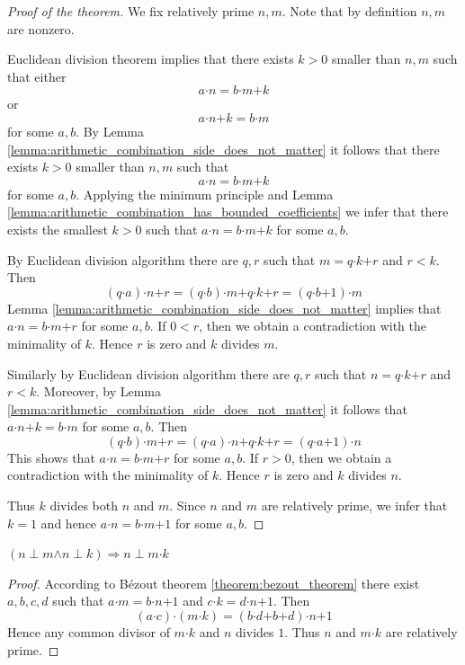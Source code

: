 \documentclass[10pt]{amsart}
\newcommand{\mra}{\boldsymbol{\Rightarrow}}
\newcommand{\mand}{\boldsymbol{\wedge}}
\newcommand{\mle}{\boldsymbol{<}}
\newcommand{\mge}{\boldsymbol{>}}
\newcommand{\meq}{\boldsymbol{=}}
\newcommand{\mplus}{\boldsymbol{+}}
\newcommand{\mdot}{\boldsymbol{\cdot}}
\newcommand{\theoremlabels}[2]{#1][#2}
\begin{document}
\begin{proof}[Proof of the theorem]
	We fix relatively prime $n,m$. Note that by definition $n,m$ are nonzero.

	Euclidean division theorem implies that there exists $k \mge 0$ smaller than $n,m$ such that either
	$$a\mdot n \meq b\mdot m \mplus k$$
	or
	$$a\mdot n \mplus k \meq b\mdot m$$
	for some $a,b$. By Lemma \ref{lemma:arithmetic_combination_side_does_not_matter} it follows that there exists $k \mge 0$ smaller than $n,m$ such that
	$$a\mdot n \meq b\mdot m \mplus k$$
	for some $a,b$. Applying the minimum principle and Lemma \ref{lemma:arithmetic_combination_has_bounded_coefficients} we infer that there exists the smallest $k \mge 0$ such that $a\mdot n \meq b\mdot m \mplus k$ for some $a,b$.

	By Euclidean division algorithm there are $q,r$ such that $m \meq q\mdot k \mplus r$ and $r \mle k$. Then
	$$(q\mdot a)\mdot n \mplus r \meq (q\mdot b)\mdot m \mplus q\mdot k \mplus r \meq (q\mdot b \mplus 1)\mdot m$$
	Lemma \ref{lemma:arithmetic_combination_side_does_not_matter} implies that $a\mdot n \meq b\mdot m \mplus r$ for some $a,b$. If $0 \mle r$, then we obtain a contradiction with the minimality of $k$. Hence $r$ is zero and $k$ divides $m$.

	Similarly by Euclidean division algorithm there are $q,r$ such that $n \meq q \mdot k \mplus r$ and $r \mle k$. Moreover, by Lemma \ref{lemma:arithmetic_combination_side_does_not_matter} it follows that $a\mdot n \mplus k \meq b\mdot m$ for some $a,b$. Then
	$$(q\mdot b) \mdot m \mplus r \meq (q\mdot a) \mdot n \mplus q\mdot k \mplus r \meq (q\mdot a \mplus 1)\mdot n$$
	This shows that $a\mdot n \meq b\mdot m \mplus r$ for some $a,b$. If $r \mge 0$, then we obtain a contradiction with the minimality of $k$. Hence $r$ is zero and $k$ divides $n$.

	Thus $k$ divides both $n$ and $m$. Since $n$ and $m$ are relatively prime, we infer that $k \meq 1$ and hence $a\mdot n \meq b\mdot m \mplus 1$ for some $a,b$.
\end{proof}

\begin{corollary}[\theoremlabels{$\mathrm{PRA}$}{Euclid's lemma}]\label{corollary:euclids_lemma}
	$\left(n \perp m \mand n \perp k\right) \mra n \perp m \mdot k$
\end{corollary}
\begin{proof}
	According to B{\'e}zout theorem \ref{theorem:bezout_theorem} there exist $a,b,c,d$ such that $a\mdot m \meq b\mdot n \mplus 1$ and $c\mdot k \meq d\mdot n \mplus 1$. Then
	$$(a\mdot c)\mdot (m\mdot k) \meq (b\mdot d \mplus b \mplus d) \mdot n \mplus 1$$
	Hence any common divisor of $m\mdot k$ and $n$ divides $1$. Thus $n$ and $m\mdot k$ are relatively prime.
\end{proof}
\end{document}
